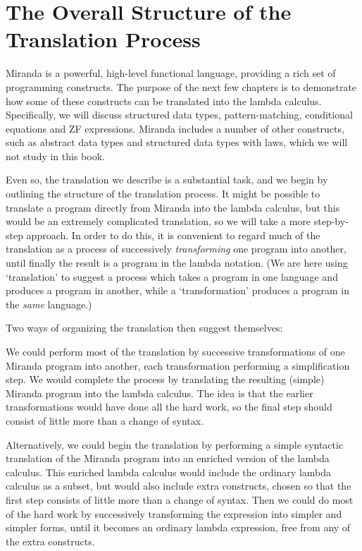 \section{The Overall Structure of the Translation Process}
Miranda is a powerful, high-level functional language, providing a rich set of programming constructs. The purpose of the next few chapters is to demonstrate how some of these constructs can be translated into the lambda calculus. Specifically, we will discuss structured data types, pattern-matching, conditional equations and ZF expressions. Miranda includes a number of other constructs, such as abstract data types and structured data types with laws, which we will not study in this book.

Even so, the translation we describe is a substantial task, and we begin by outlining the structure of the translation process. It might be possible to translate a program directly from Miranda into the lambda calculus, but this would be an extremely complicated translation, so we will take a more step-by-step approach. In order to do this, it is convenient to regard much of the translation as a process of successively \textit{transforming} one program into another, until finally the result is a program in the lambda notation. (We are here using `translation' to suggest a process which takes a program in one language and produces a program in another, while a `transformation' produces a program in the \textit{same} language.)

Two ways of organizing the translation then suggest themselves:

\begin{numbered}
    \item We could perform most of the translation by successive transformations of one Miranda program into another, each transformation performing a simplification step. We would complete the process by translating the resulting (simple) Miranda program into the lambda calculus. The idea is that the earlier transformations would have done all the hard work, so the final step should consist of little more than a change of syntax.

    \item Alternatively, we could begin the translation by performing a simple syntactic translation of the Miranda program into an enriched version of the lambda calculus. This enriched lambda calculus would include the ordinary lambda calculus as a subset, but would also include extra constructs, chosen so that the first step consists of little more than a change of syntax. Then we could do most of the hard work by successively transforming the expression into simpler and simpler forms, until it becomes an ordinary lambda expression, free from any of the extra constructs.
\end{numbered}

